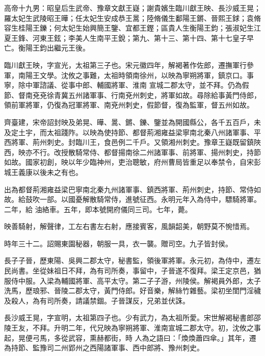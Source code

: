 
\begin{pinyinscope}

 高帝十九男：昭皇后生武帝、豫章文獻王嶷；謝貴嬪生臨川獻王映、長沙威王晃；羅太妃生武陵昭王曄；任太妃生安成恭王暠；陸脩儀生鄱陽王鏘、晉熙王銶；袁脩容生桂陽王鑠；何太妃生始興簡王鑒、宜都王鏗；區貴人生衡陽王鈞；張淑妃生江夏王鋒、河東王鉉；李美人生南平王銳；第九、第十三、第十四、第十七皇子早亡。衡陽王鈞出繼元王後。



 臨川獻王映，字宣光，太祖第三子也。宋元徽四年，解褐著作佐郎，遷撫軍行參軍，南陽王文學。沈攸之事難，太祖時領南徐州，以映為寧朔將軍，鎮京口。事寧，除中軍諮議、從事中郎、輔國將軍、淮南
 宣城二郡太守，並不拜。仍為假節、督南兗兗徐青冀五州諸軍事、行南兗州刺史，將軍如故。尋除給事黃門侍郎，領前軍將軍，仍復為冠軍將軍、南兗州刺史，假節督，復為監軍，督五州如故。



 齊臺建，宋帝詔封映及弟晃、曄、暠、鏘、鑠、鑒並為開國縣公，各千五百戶，未及定土宇，而太祖踐阼。以映為使持節、都督荊湘雍益梁寧南北秦八州諸軍事、平西將軍、荊州刺史。封臨川王，食邑例二千戶。又領湘州刺史。豫章王嶷既留鎮陜西，映亦不行。改授散騎常侍、都督揚南徐二州諸軍事、前將軍、揚州刺史，持節如故。國家初創，映以年少臨神州，吏治聰敏，府州曹局皆重足以奉禁令，自宋彭城王義康以後未之有也。



 出為都督荊湘雍益梁巴寧南北秦九州諸軍事、鎮西將軍、荊州刺史，持節、常侍如故。給鼓吹一部。以國憂解散騎常侍，進號征西。永明元年入為侍中，驃騎將軍。二年，給
 油絡車。五年，即本號開府儀同三司。七年，薨。



 映善騎射，解聲律，工左右書左右射，應接賓客，風韻韶美，朝野莫不惋惜焉。



 時年三十二。詔賜東園秘器，朝服一具，衣一襲。贈司空。九子皆封侯。



 長子子晉，歷東陽、吳興二郡太守，秘書監，領後軍將軍。永元初，為侍中，遷左民尚書。坐從妹祖日不拜，為有司所奏，事留中，子晉遂不復拜。梁王定京邑，猶服侍中服。入梁為輔國將軍、高平太守。第二子子游，州陵侯。解褐員外郎，太子洗馬，歷琅邪、晉陵二郡太守，黃門侍郎。好音樂，解絲竹雜藝。梁初坐閨門淫穢及殺人，為有司所奏，請議禁錮。子晉謀反，兄弟並伏誅。



 長沙威王晃，字宣明，太祖第四子也。少有武力，為太祖所愛。宋世解褐秘書郎邵陵王友，不拜。升明二年，代兄映為寧朔將軍、淮南宣城二郡太守。初，沈攸之事起，晃便弓馬，多從武容，熏赫都街，時
 人為之語曰：「煥煥蕭四傘。」其年，遷為持節、監豫司二州郢州之西陽諸軍事、西中郎將、豫州刺史。




\end{pinyinscope}
